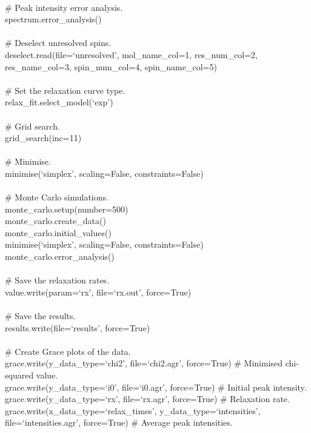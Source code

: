 \begin{exampleenv}
 \\
\# Peak intensity error analysis. \\
spectrum.error\_analysis() \\
 \\
\# Deselect unresolved spins. \\
deselect.read(file=`unresolved', mol\_name\_col=1, res\_num\_col=2, res\_name\_col=3, spin\_num\_col=4, spin\_name\_col=5) \\
 \\
\# Set the relaxation curve type. \\
relax\_fit.select\_model(`exp') \\
 \\
\# Grid search. \\
grid\_search(inc=11) \\
 \\
\# Minimise. \\
minimise(`simplex', scaling=False, constraints=False) \\
 \\
\# Monte Carlo simulations. \\
monte\_carlo.setup(number=500) \\
monte\_carlo.create\_data() \\
monte\_carlo.initial\_values() \\
minimise(`simplex', scaling=False, constraints=False) \\
monte\_carlo.error\_analysis() \\
 \\
\# Save the relaxation rates. \\
value.write(param=`rx', file=`rx.out', force=True) \\
 \\
\# Save the results. \\
results.write(file=`results', force=True) \\
 \\
\# Create Grace plots of the data. \\
grace.write(y\_data\_type=`chi2', file=`chi2.agr', force=True)    \# Minimised chi-squared value. \\
grace.write(y\_data\_type=`i0', file=`i0.agr', force=True)    \# Initial peak intensity. \\
grace.write(y\_data\_type=`rx', file=`rx.agr', force=True)    \# Relaxation rate. \\
grace.write(x\_data\_type=`relax\_times', y\_data\_type=`intensities', file=`intensities.agr', force=True)    \# Average peak intensities. \\

\end{exampleenv}
